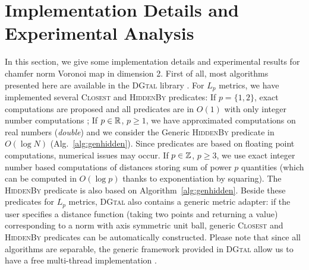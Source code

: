 \documentclass{llncs}
\begin{document}


\section{Implementation Details and Experimental Analysis}
\label{sec:exper-analys}

In this section, we give some implementation details and experimental
results for chamfer norm Voronoi map in dimension 2.  First of all,
most algorithms presented here are available in the \textsc{DGtal}
library \cite{dgtal}. For $L_p$ metrics, we have implemented several
\textsc{Closest} and \textsc{HiddenBy} predicates: If $p=\{1,2\}$,
exact computations are proposed and all predicates are in $O(1)$ with
only integer number computations
\cite{Hirata,Maurer2003,roerdnik}; If $p\in {\mathbb{R}}$, $p\geq 1$, we
have approximated computations on real numbers (\emph{double}) and we
consider the Generic \textsc{HiddenBy} predicate in $O(\log N)$
(Alg.~\ref{alg:genhidden}). Since predicates are based on floating
point computations, numerical issues may occur. If $p\in {\mathbb{Z}}$, $p\geq
3$, we use exact integer number based computations of distances
storing sum of power $p$ quantities (which can be computed in
$O(\log{p})$ thanks to exponentiation by squaring). The
\textsc{HiddenBy} predicate is also based on
Algorithm~\ref{alg:genhidden}.
Beside these predicates for $L_p$ metrics, \textsc{DGtal} also
contains a generic metric adapter: if the user specifies a distance
function (taking two points and returning a value) corresponding to a
norm with axis symmetric unit ball, generic \textsc{Closest} and \textsc{HiddenBy} predicates can be
automatically constructed. Please note that since all algorithms are
separable, the generic framework provided in \textsc{DGtal} allow us to
have a free multi-thread implementation \cite{dcoeurjo_ChapDTWADGMM}.
\end{document}
